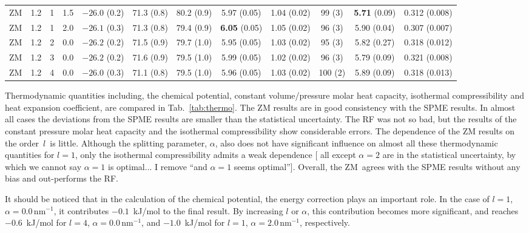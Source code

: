 \documentclass[a4paper,preprint,unsortedaddress,onecolumn,fleqn]{revtex4}
\newcommand{\recheck}[1]{{\color{red} #1}}
\begin{document}
\begin{sidewaystable}
\begin{tabular*}{0.99\textwidth}{@{\extracolsep{\fill}}cccc cccccccc}
    ZM          &1.2 & 1  &1.5 & $-26.0$ (0.2) & 71.3 (0.8)  &80.2 (0.9)           & 5.97 (0.05)               &1.04 (0.02)          & 99 (3)          & \textbf{5.71} (0.09)&        {0.312} (0.008)\\ 
    ZM          &1.2 & 1  &2.0 & $-26.1$ (0.3) & 71.3 (0.8)  &79.4 (0.9)           & \textbf{6.05} (0.05)      &1.05 (0.02)          & 96 (3)          &        {5.90} (0.04)&        {0.307} (0.007)\\\hline
    ZM          &1.2 & 2  &0.0 & $-26.2$ (0.2) & 71.5 (0.9)  &79.7 (1.0)           & 5.95 (0.05)               &1.03 (0.02)          & 95 (3)          &         5.82  (0.27)&         0.318  (0.012)\\
    ZM          &1.2 & 3  &0.0 & $-26.2$ (0.2) & 71.6 (0.9)  &79.5 (1.0)           & 5.99 (0.05)               &1.02 (0.02)          & 96 (3)          &         5.79  (0.09)&         0.321  (0.008)\\
    ZM          &1.2 & 4  &0.0 & $-26.0$ (0.3) & 71.1 (0.8)  &79.5 (1.0)           & 5.96 (0.05)               &1.03 (0.02)          &100 (2)          &         5.89  (0.09)&         0.318  (0.013)\\
    \hline\hline
  \end{tabular*}
  \label{tab:thermo}
\end{sidewaystable}

Thermodynamic quantities including, the chemical potential, constant
volume/pressure molar heat capacity, isothermal compressibility and heat
expansion coefficient, are compared in Tab.~\ref{tab:thermo}. The ZM results
are in good consistency with the SPME results. In almost all cases the
deviations from the SPME results are smaller than the statistical
uncertainty. The RF was not so bad, but the results of the constant pressure
molar heat capacity and the isothermal compressibility show considerable
errors.
The dependence of the ZM results on the order\ $l$\ is \recheck{little}.
Although the splitting parameter, $\alpha $, also does not have significant
influence on almost all these thermodynamic quantities for $l=1$, only the
isothermal compressibility admits a weak dependence [\recheck{all except $\alpha=2$ are in the statistical uncertainty, by which we cannot say $\alpha=1$ is optimal... I remove ``and $\alpha=1$ seems optimal''}].
Overall, the ZM\ agrees with the SPME results without any bias and
out-performs the RF.

\recheck{
  It should be noticed that in the calculation of the chemical potential,
  the energy correction plays an important role. In the case of $l=1$, $\alpha = 0.0\,\text{nm}^{-1}$,
  it contributes $-0.1$~kJ/mol to the final result.
  By increasing $l$ or $\alpha$, this contribution
  becomes more significant, and reaches $-0.6$~kJ/mol for $l=4$, $\alpha = 0.0\,\text{nm}^{-1}$, and
  $-1.0$~kJ/mol for $l=1$, $\alpha = 2.0\,\text{nm}^{-1}$, respectively.
}
\end{document}
